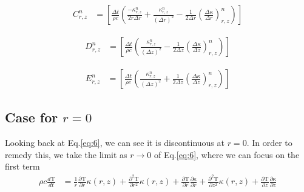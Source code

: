 \documentclass[12pt]{article}
\begin{document}
		\begin{equation}
		\begin{aligned}
		C^n_{r, z} &= \left [ \frac{\Delta t}{\rho c}\left (\frac{-\kappa^n_{r, z}}{2r\Delta r} + \frac{\kappa^n_{r, z}}{(\Delta r)^2} - \frac{1}{2\Delta r} \left(\frac{\Delta\kappa}{\Delta r}\right)^n_{r, z} \right )\right ]
		\end{aligned}
		\end{equation}
		
		\begin{equation}
		\begin{aligned}
		D^n_{r, z} &= \left [ \frac{\Delta t}{\rho c}\left (\frac{\kappa^n_{r, z}}{(\Delta z)^2} - \frac{1}{2\Delta z}\left(\frac{\Delta\kappa}{\Delta z}\right)^n_{r, z} \right ) \right ]
		\end{aligned}
		\end{equation}
		
		\begin{equation}
		\begin{aligned}
		E^n_{r, z} &= \left [ \frac{\Delta t}{\rho c}\left ( \frac{\kappa^n_{r, z}}{(\Delta z)^2} + \frac{1}{2\Delta z}\left(\frac{\Delta\kappa}{\Delta z}\right )^n_{r, z} \right ) \right ] 
		\end{aligned}
		\end{equation}

    \subsection{Case for $r=0$}
      Looking back at Eq.\ref{eq:6}, we can see it is discontinuous at $r=0$. In order to remedy this, we take the limit as $r\rightarrow0$ of Eq.\ref{eq:6}, where we can focus on the first term
      \begin{equation}
        \begin{aligned}
          \rho c \frac{d\mathrm{T}}{dt} &= \frac{1}{r} \frac{\partial\mathrm{T}}{\partial r}\kappa(r, z) + \frac{\partial^2\mathrm{T}}{\partial r^2}\kappa(r, z)  + \frac{\partial\mathrm{T}}{\partial r} \frac{\partial\mathrm{\kappa}}{\partial r}  + \frac{\partial^2\mathrm{T}}{\partial z^2}\kappa(r, z) + \frac{\partial\mathrm{T}}{\partial z}\frac{\partial\mathrm{\kappa}}{\partial z} \\
        \end{aligned}
      \end{equation}	
\end{document}
